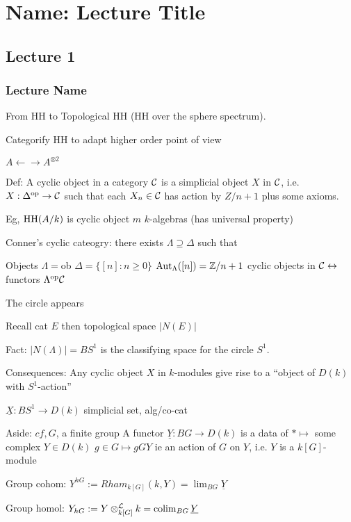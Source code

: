 \newpage
\section{Name: Lecture Title}
\subsection{Lecture 1}
\subsubsection{Lecture Name}

From HH to Topological HH (HH over the sphere spectrum).

Categorify HH to adapt higher order point of view

$A \leftarrow \rightarrow A^{\otimes 2}$ %


Def: A cyclic object in a category $\mathcal{C}$ is a simplicial object $X$ in $\mathcal{C}$, i.e. $X: \Delta^\text{op} \to \mathcal{C}$ such that each $X_n \in \mathcal{C}$ has action by $Z/n+1$ plus some axioms. 




Eg, $\operatorname{HH}(A/k)$ is cyclic object $m$ $k$-algebras (has universal property)

Conner's cyclic cateogry: there exists $\Lambda \supseteq \Delta$ such that 

Objects $\Lambda= $ob $\Delta=\{[n] \colon n \geq 0\}$
$\operatorname{Aut}_\Lambda([n])= \mathbb{Z}/n+1$
cyclic objects in $\mathcal{C} \leftrightarrow$ functors $\Lambda^{\text{op}} \mathcal{C}$

The circle appears

Recall cat $E$ then topological space $|N(E)|$

Fact: $|N(\Lambda)|= BS^1$ is the classifying space for the circle $S^1$. 

Consequences: Any cyclic object $X$ in $k$-modules give rise to a ``object of $D(k)$ with $S^1$-action''

$\underline{X}: BS^1 \to D(k)$
simplicial set, alg/co-cat

Aside: $cf, G$, a finite group
A functor $\underline{Y}: BG \to D(k)$ is a data of 
$* \mapsto$ some complex $Y \in D(k)$
$g \in G \mapsto gGY$ ie an action of $G$ on $Y$, i.e. $Y$ is a $k[G]$-module

Group cohom: 
$Y^{hG}:= Rham_{k[G]}(k,Y)= \lim_{BG} \underline{Y}$

Group homol:
$Y_{hG}:= Y \otimes_{k[G]}^\mathcal{L} k = \operatorname{colim}_{BG} \underline{Y}$

